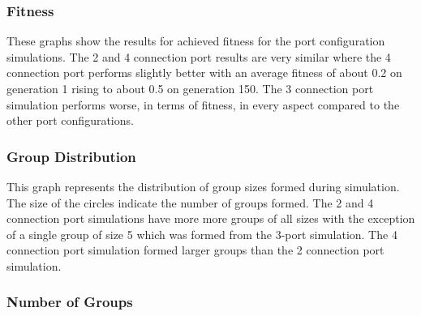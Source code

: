 \vspace*{\fill}
\begin{center}
	\subsubsection{Fitness}
	\vspace*{-0.6cm}
\end{center}


These graphs show the results for achieved fitness for the port configuration simulations.
The 2 and 4 connection port results are very similar where the 4 connection port performs slightly better with an average fitness of about 0.2 on generation 1 rising to about 0.5 on generation 150. 
The 3 connection port simulation performs worse, in terms of fitness, in every aspect compared to the other port configurations.

\vspace*{\fill}
\newpage
\vspace*{\fill}
\begin{center}
	\subsubsection{Group Distribution}
	\vspace*{-0.6cm}
\end{center}


This graph represents the distribution of group sizes formed during simulation.
The size of the circles indicate the number of groups formed.
The 2 and 4 connection port simulations have more more groups of all sizes with the exception of a single group of size 5 which was formed from the 3-port simulation.
The 4 connection port simulation formed larger groups than the 2 connection port simulation.

\vspace*{\fill}
\newpage
\vspace*{\fill}
\begin{center}
	\subsubsection{Number of Groups}
	\vspace*{-0.6cm}
\end{center}

